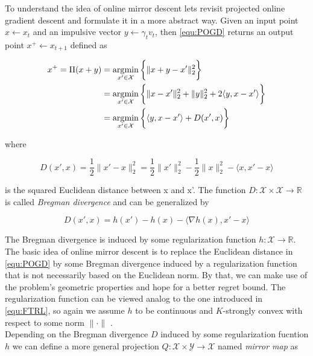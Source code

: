 To understand the idea of online mirror descent lets revisit projected online gradient descent and formulate it in a more abstract way. Given an input point $x \gets x_t$ and an impulsive vector $y \gets \gamma_t v_t$, then \ref{equ:POGD} returns an output point $x^+ \gets x_{t+1}$ defined as

\begin{equation}
\begin{split}
x^+ = \Pi(x + y) & = \operatorname*{\arg\!\min}_{x' \in \mathcal{X}}\bigg\{\|x + y - x'\|_2^2\bigg\} \\
 & = \operatorname*{\arg\!\min}_{x' \in \mathcal{X}}\bigg\{\|x - x'\|_2^2 + \|y\|_2^2 + 2\langle y,x-x'\rangle\bigg\} \\
 & = \operatorname*{\arg\!\min}_{x' \in \mathcal{X}}\bigg\{\langle y,x-x'\rangle + D(x',x)\bigg\}
\end{split}
\label{equ:EuclideanProj}
\end{equation}

where 

\begin{equation*}
    D(x',x) = \frac{1}{2}\|x'-x\|_2^2 = \frac{1}{2}\|x'\|_2^2 - \frac{1}{2}\|x\|_2^2 - \langle x,x'-x\rangle
\end{equation*}

is the squared Euclidean distance between x and x'. The function $D: \mathcal{X}\times\mathcal{X} \to \mathbb{R}$ is called \textit{Bregman divergence} and can be generalized by 

\begin{equation*}
    D(x',x) = h(x') - h(x) - \langle\nabla h(x), x'-x\rangle
\end{equation*}

The Bregman divergence is induced by some regularization function $h: \mathcal{X} \to \mathbb{R}$. The basic idea of online mirror descent is to replace the Euclidean distance in \ref{equ:POGD} by some Bregman divergence induced by a regularization function that is not necessarily based on the Euclidean norm. By that, we can make use of the problem's geometric properties and hope for a better regret bound. The regularization function can be viewed analog to the one introduced in \ref{equ:FTRL}, so again we assume $h$ to be continuous and $K$-strongly convex with respect to some norm $\|\cdot\|$ \cite{HDRmertikopoulos}. \\

Depending on the Bregman divergence $D$ induced by some regularization fucntion $h$ we can define a more general projection $Q:\mathcal{X}\times\mathcal{Y} \to \mathcal{X}$ named \textit{mirror map} as 

